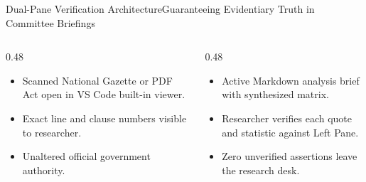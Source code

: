 \documentclass[aspectratio=169, 10pt]{beamer}
\begin{document}
\begin{frame}{Dual-Pane Verification Architecture}{Guaranteeing Evidentiary Truth in Committee Briefings}
  \begin{columns}[c]
    \begin{column}{0.48\textwidth}
      \begin{tcolorbox}[colback=lightgrey, colframe=tanzaniablue, arc=1.5mm, boxrule=0.8pt, title=\textbf{Left Pane: Raw Statutory Source}]
        \small
        \begin{itemize}
          \item Scanned National Gazette or PDF Act open in VS Code built-in viewer.
          \item Exact line and clause numbers visible to researcher.
          \item Unaltered official government authority.
        \end{itemize}
      \end{tcolorbox}
    \end{column}
    \begin{column}{0.48\textwidth}
      \begin{tcolorbox}[colback=calloutbg, colframe=suagreen, arc=1.5mm, boxrule=0.8pt, title=\textbf{Right Pane: Synthesized Analysis}]
        \small
        \begin{itemize}
          \item Active Markdown analysis brief with synthesized matrix.
          \item Researcher verifies each quote and statistic against Left Pane.
          \item Zero unverified assertions leave the research desk.
        \end{itemize}
      \end{tcolorbox}
    \end{column}
  \end{columns}
\end{frame}
\end{document}
